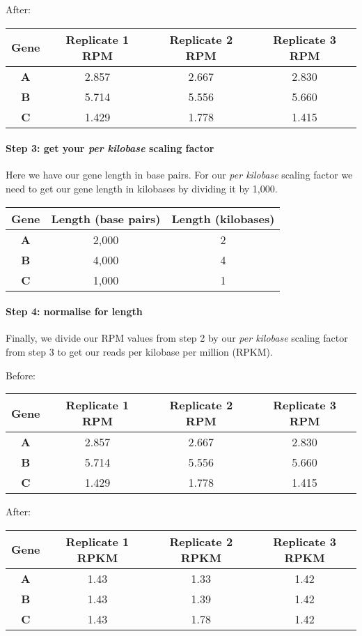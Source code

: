 \documentclass[11pt]{article}
\begin{document}
\newpage

After:

\begin{longtable}[]{@{}cccc@{}}
\hline
Gene & Replicate 1 RPM & Replicate 2 RPM & Replicate 3
RPM\tabularnewline
\hline
\endhead
\textbf{A} & 2.857 & 2.667 & 2.830\tabularnewline
\textbf{B} & 5.714 & 5.556 & 5.660\tabularnewline
\textbf{C} & 1.429 & 1.778 & 1.415\tabularnewline
\hline
\end{longtable}

\hypertarget{step-3-get-your-per-kilobase-scaling-factor}{%
\paragraph{\texorpdfstring{Step 3: get your \textit{per kilobase} scaling
factor}{Step 3: get your per kilobase scaling factor}}\label{step-3-get-your-per-kilobase-scaling-factor}}

Here we have our gene length in base pairs. For our \textit{per kilobase}
scaling factor we need to get our gene length in kilobases by dividing
it by 1,000.

\begin{longtable}[]{@{}ccc@{}}
\hline
Gene & Length (base pairs) & Length (kilobases)\tabularnewline
\hline
\endhead
\textbf{A} & 2,000 & 2\tabularnewline
\textbf{B} & 4,000 & 4\tabularnewline
\textbf{C} & 1,000 & 1\tabularnewline
\hline
\end{longtable}

\hypertarget{step-4-normalise-for-length}{%
\paragraph{Step 4: normalise for
length}\label{step-4-normalise-for-length}}

Finally, we divide our RPM values from step 2 by our \textit{per kilobase}
scaling factor from step 3 to get our reads per kilobase per million
(RPKM).

Before:

\begin{longtable}[]{@{}cccc@{}}
\hline
Gene & Replicate 1 RPM & Replicate 2 RPM & Replicate 3
RPM\tabularnewline
\hline
\endhead
\textbf{A} & 2.857 & 2.667 & 2.830\tabularnewline
\textbf{B} & 5.714 & 5.556 & 5.660\tabularnewline
\textbf{C} & 1.429 & 1.778 & 1.415\tabularnewline
\hline
\end{longtable}

After:

\begin{longtable}[]{@{}cccc@{}}
\hline
Gene & Replicate 1 RPKM & Replicate 2 RPKM & Replicate 3
RPKM\tabularnewline
\hline
\endhead
\textbf{A} & 1.43 & 1.33 & 1.42\tabularnewline
\textbf{B} & 1.43 & 1.39 & 1.42\tabularnewline
\textbf{C} & 1.43 & 1.78 & 1.42\tabularnewline
\hline
\end{longtable}
\end{document}
